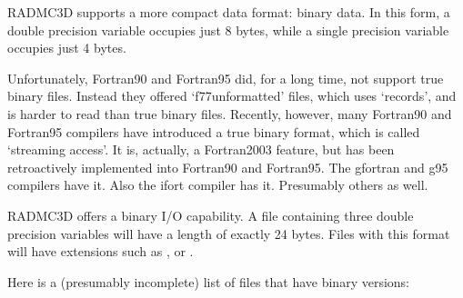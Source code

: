 \documentclass[letterpaper,10pt,english]{sphinxmanual}
\begin{document}
RADMC\sphinxhyphen{}3D supports a more compact data format: binary data. In this form, a
double precision variable occupies just 8 bytes, while a single precision
variable occupies just 4 bytes.

Unfortunately, Fortran\sphinxhyphen{}90 and Fortran\sphinxhyphen{}95 did, for a long time, not support true
binary files. Instead they offered ‘f77\sphinxhyphen{}unformatted’ files, which uses
‘records’, and is harder to read than true binary files. Recently, however, many
Fortran\sphinxhyphen{}90 and Fortran\sphinxhyphen{}95 compilers have introduced a true binary format, which
is called ‘streaming access’. It is, actually, a Fortran\sphinxhyphen{}2003 feature, but has
been retroactively implemented into Fortran\sphinxhyphen{}90 and Fortran\sphinxhyphen{}95. The gfortran and
g95 compilers have it. Also the ifort compiler has it. Presumably others as
well.

RADMC\sphinxhyphen{}3D offers a binary I/O capability. A file containing three double
precision variables will have a length of exactly 24 bytes. Files with this
format will have extensions such as ,  or .

Here is a (presumably incomplete) list of files that have binary versions:
\end{document}

